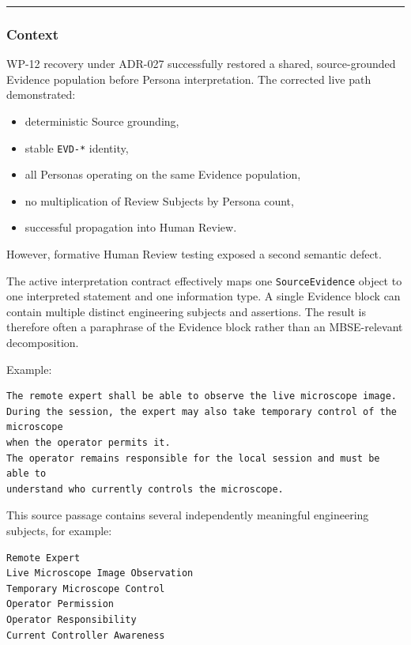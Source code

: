 \begin{center}\rule{0.5\linewidth}{0.5pt}\end{center}

\hypertarget{context-14}{%
\subsubsection{Context}\label{context-14}}

WP-12 recovery under ADR-027 successfully restored a shared, source-grounded Evidence population before Persona interpretation. The corrected live path demonstrated:

\begin{itemize}
\tightlist
\item
  deterministic Source grounding,
\item
  stable \texttt{EVD-*} identity,
\item
  all Personas operating on the same Evidence population,
\item
  no multiplication of Review Subjects by Persona count,
\item
  successful propagation into Human Review.
\end{itemize}

However, formative Human Review testing exposed a second semantic defect.

The active interpretation contract effectively maps one \texttt{SourceEvidence} object to one interpreted statement and one information type. A single Evidence block can contain multiple distinct engineering subjects and assertions. The result is therefore often a paraphrase of the Evidence block rather than an MBSE-relevant decomposition.

Example:

\begin{verbatim}
The remote expert shall be able to observe the live microscope image.
During the session, the expert may also take temporary control of the microscope
when the operator permits it.
The operator remains responsible for the local session and must be able to
understand who currently controls the microscope.
\end{verbatim}

This source passage contains several independently meaningful engineering subjects, for example:

\begin{verbatim}
Remote Expert
Live Microscope Image Observation
Temporary Microscope Control
Operator Permission
Operator Responsibility
Current Controller Awareness
\end{verbatim}

